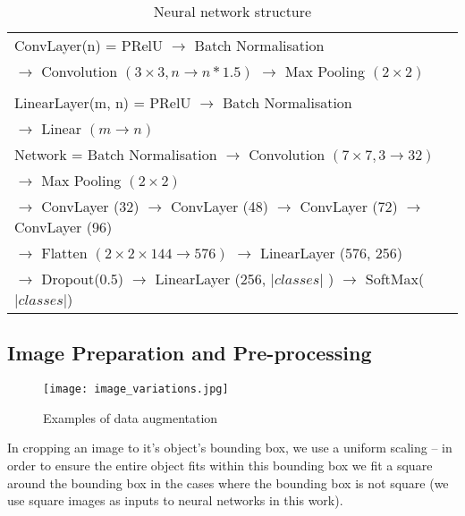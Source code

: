 \documentclass[conference]{IEEEtran}
\begin{document}
\begin{table}[h]
  \centering
    \caption{Neural network structure }
\begin{tabular}{ l } 

\toprule

 ConvLayer(n) = PRelU $\rightarrow$ Batch Normalisation \\ 
 $\rightarrow$  Convolution $(3\times3, n \rightarrow n * 1.5)$ $\rightarrow$  Max Pooling $(2\times2)$ \\
\\
 LinearLayer(m, n)  = PRelU $\rightarrow$ Batch Normalisation \\  $\rightarrow$  Linear $(m \rightarrow n)$ \\
\toprule
  Network = Batch Normalisation $\rightarrow$
 Convolution $(7\times7, 3 \rightarrow 32)$ \\
 $\rightarrow$ Max Pooling $(2\times2)$   \\

  $\rightarrow$ ConvLayer (32) $\rightarrow$  ConvLayer (48) $\rightarrow$ ConvLayer (72) $\rightarrow$ ConvLayer (96)   \\
  
  
  $\rightarrow$ Flatten $(2\times2\times144 \rightarrow 576)$ $\rightarrow$ LinearLayer (576, 256) \\
  
  $\rightarrow$ Dropout(0.5) $\rightarrow$ LinearLayer (256, $\vert classes \vert$ )  $\rightarrow$  SoftMax($\vert classes \vert$) \\
  
    
       
\toprule
\end{tabular}

\label{fig:network}
\end{table}




\subsection {Image Preparation and Pre-processing}


\begin{figure*}[t]
    \caption{Examples of data augmentation }
\centering
\texttt{[image: image\_variations.jpg]}
\label{fig:variations}
\end{figure*}


In cropping an image to it's object's bounding box, we use a uniform scaling -- in order to ensure the entire object fits within this bounding box we fit a square around the bounding box in the cases where the bounding box is not square (we use square images as inputs to neural networks in this work).
\end{document}
